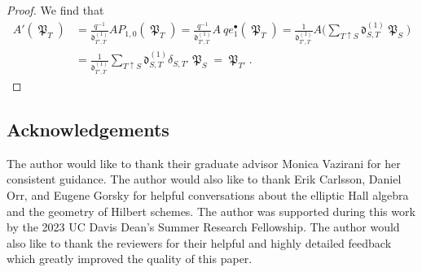 \documentclass[pdftex]{sigma}
\numberwithin{equation}{section}
\theoremstyle{definition}
\DeclareMathOperator{\MacD}{\mathfrak{P}}
\begin{document}
\begin{proof}
 We find that
 \begin{align*}
 A'(\MacD_T)& = \frac{q^{-1}}{\mathfrak{d}^{(1)}_{T',T}} A P_{1,0} (\MacD_T)
 = \frac{q^{-1}}{\mathfrak{d}^{(1)}_{T',T}} A~qe_1^{\bullet}(\MacD_T)
 = \frac{1}{\mathfrak{d}^{(1)}_{T',T}}A\biggl( \sum_{T\uparrow S} \mathfrak{d}^{(1)}_{S,T} \MacD_S\biggr) \\
 & = \frac{1}{\mathfrak{d}^{(1)}_{T',T}}\sum_{T\uparrow S} \mathfrak{d}^{(1)}_{S,T} \delta_{S,T'}\MacD_S
 = \MacD_{T'}. \tag*{\qed}
 \end{align*} \renewcommand{\qed}{}
\end{proof}

\subsection*{Acknowledgements}

The author would like to thank their graduate advisor Monica Vazirani for her consistent guidance. The author would also like to thank Erik Carlsson, Daniel Orr, and Eugene Gorsky for helpful conversations about the elliptic Hall algebra and the geometry of Hilbert schemes. The author was supported during this work by the 2023 UC Davis Dean's Summer Research Fellowship. The author would also like to thank the reviewers for their helpful and highly detailed feedback which greatly improved the quality of this paper.
\end{document}
